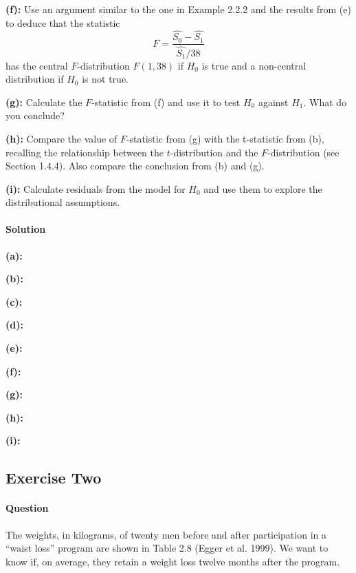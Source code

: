 \documentclass[]{article}
\let\oldparagraph\paragraph
\renewcommand{\paragraph}[1]{\oldparagraph{#1}\mbox{}}
\begin{document}
\textbf{(f):} Use an argument similar to the one in Example 2.2.2 and
the results from (e) to deduce that the statistic \[ 
F = \frac{\hat{S_0} - \hat{S_1}}{\hat{S_1}/38}
\] has the central \(F\)-distribution \(F(1,38)\) if \(H_0\) is true and
a non-central distribution if \(H_0\) is not true.

\textbf{(g):} Calculate the \(F\)-statistic from (f) and use it to test
\(H_0\) against \(H_1\). What do you conclude?

\textbf{(h):} Compare the value of \(F\)-statistic from (g) with the
t-statistic from (b), recalling the relationship between the
\(t\)-distribution and the \(F\)-distribution (see Section 1.4.4). Also
compare the conclusion from (b) and (g).

\textbf{(i):} Calculate residuals from the model for \(H_0\) and use
them to explore the distributional assumptions.

\paragraph{Solution}\label{solution}

\textbf{(a):}

\textbf{(b):}

\textbf{(c):}

\textbf{(d):}

\textbf{(e):}

\textbf{(f):}

\textbf{(g):}

\textbf{(h):}

\textbf{(i):}

\subsection{Exercise Two}\label{exercise-two}

\paragraph{Question}\label{question-1}

The weights, in kilograms, of twenty men before and after participation
in a ``waist loss'' program are shown in Table 2.8 (Egger et al. 1999).
We want to know if, on average, they retain a weight loss twelve months
after the program.
\end{document}
